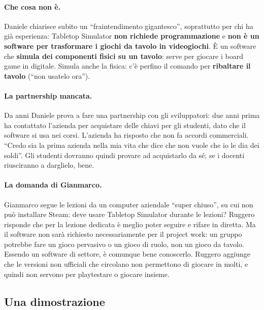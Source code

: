 \paragraph{Che cosa non è.} Daniele chiarisce subito un ``fraintendimento
gigantesco'', soprattutto per chi ha già esperienza: Tabletop Simulator
\textbf{non richiede programmazione} e \textbf{non è un software per
trasformare i giochi da tavolo in videogiochi}. È un software che
\textbf{simula dei componenti fisici su un tavolo}: serve per giocare i board
game in digitale. Simula anche la fisica: c'è perfino il comando per
\textbf{ribaltare il tavolo} (``non usatelo ora'').

\paragraph{La partnership mancata.} Da anni Daniele prova a fare una
partnership con gli sviluppatori: due anni prima ha contattato l'azienda per
acquistare delle chiavi per gli studenti, dato che il software si usa nei corsi.
L'azienda ha risposto che non fa accordi commerciali. ``Credo sia la prima
azienda nella mia vita che dice che non vuole che io le dia dei soldi''. Gli
studenti dovranno quindi provare ad acquistarlo da sé; se i docenti riusciranno a
darglielo, bene.

\paragraph{La domanda di Gianmarco.} Gianmarco segue le lezioni da un computer
aziendale ``super chiuso'', su cui non può installare Steam: deve usare Tabletop
Simulator durante le lezioni? Ruggero risponde che per la lezione dedicata è
meglio poter seguire e rifare in diretta. Ma il software non sarà richiesto
necessariamente per il project work: un gruppo potrebbe fare un gioco pervasivo
o un gioco di ruolo, non un gioco da tavolo. Essendo un software di settore, è
comunque bene conoscerlo. Ruggero aggiunge che le versioni non ufficiali che
circolano non permettono di giocare in molti, e quindi non servono per
playtestare o giocare insieme.

\subsection{Una dimostrazione}

